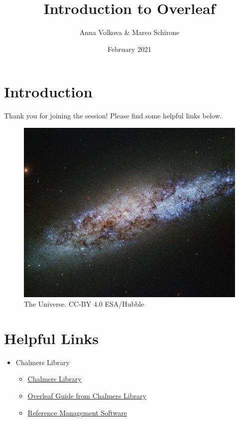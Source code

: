 \documentclass{article}
\title{\textbf{Introduction to Overleaf}}
\author{Anna Volkova \& Marco Schirone}
\date{February 2021}
\begin{document}
\maketitle

\section{Introduction}
Thank you for joining the session! Please find some helpful links below.


\begin{figure}[h!]
\centering
\includegraphics[scale=0.3]{universe}

\caption{The Universe. CC-BY 4.0 ESA/Hubble}\ccby
\label{fig:universe}
\end{figure}


\section{Helpful Links}
\begin{itemize}
\item{Chalmers Library}

    \begin{itemize}
    \item {\href{http://www.lib.chalmers.se/en/}{Chalmers Library}}
    \item {\href{https://guides.lib.chalmers.se/overleaf_latex}{Overleaf Guide from Chalmers Library}}
    \item {\href{https://guides.lib.chalmers.se/reference_management_software}{Reference Management Software}}
    \end{itemize}  

\end{itemize}
\end{document}
